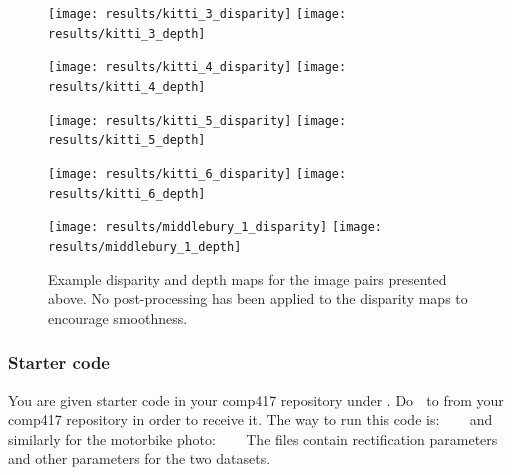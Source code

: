 \documentclass[a4paper,10pt]{article}
\begin{document}
\begin{figure}[h!]
  \begin{center}
    \texttt{[image: results/kitti\_3\_disparity]}
    \texttt{[image: results/kitti\_3\_depth]}
   \end{center}
\end{figure}

\begin{figure}[h!]
  \begin{center}
    \texttt{[image: results/kitti\_4\_disparity]}
    \texttt{[image: results/kitti\_4\_depth]}
   \end{center}
\end{figure}

\begin{figure}[h!]
  \begin{center}
    \texttt{[image: results/kitti\_5\_disparity]}
    \texttt{[image: results/kitti\_5\_depth]}
   \end{center}
\end{figure}

\begin{figure}[h!]
  \begin{center}
    \texttt{[image: results/kitti\_6\_disparity]}
    \texttt{[image: results/kitti\_6\_depth]}
   \end{center}
\end{figure}

\begin{figure}[h!]
  \begin{center}
    \texttt{[image: results/middlebury\_1\_disparity]}
    \texttt{[image: results/middlebury\_1\_depth]}
  \end{center} 
  \caption{Example disparity and depth maps for the image pairs presented above. No post-processing has been applied to the disparity maps to encourage smoothness.}
  \label{fig:results}
\end{figure}
\subsubsection{Starter code}
\noindent You are given starter code in your comp417 repository under . Do  $\;$  to 
from your comp417 repository in order to receive it. The way to run this code is:
\newline
\newline
{} $\;$  $\;$  $\;$ 
\newline
\newline
\noindent and similarly for the motorbike photo:
 $\;$  $\;$  $\;$ 
\newline
\newline
\noindent The  files contain rectification parameters and other parameters for the two datasets.
\end{document}

